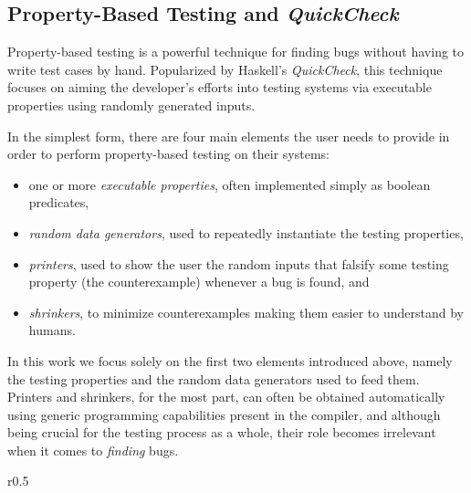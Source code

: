 \documentclass[acmsmall, anonymous]{acmart}
\newcommand{\quickcheck}{\textit{QuickCheck}\xspace}
\newcommand{\quickchick}{\textit{QuickChick}\xspace}
\newcommand{\mutagen}{\textsc{Mutagen}\xspace}
\begin{document}

\vspace{-5pt}
\subsection{Property-Based Testing and \quickcheck}

Property-based testing is a powerful technique for finding bugs without having
to write test cases by hand.
%
Popularized by Haskell's \quickcheck, this technique focuses on aiming the
developer's efforts into testing systems via executable properties using
randomly generated inputs.
%


In the simplest form, there are four main elements the user needs to provide in
order to perform property-based testing on their systems:
%
\begin{itemize}
\item one or more \emph{executable properties}, often implemented simply as
  boolean predicates,
\item \emph{random data generators}, used to repeatedly instantiate the testing
  properties,
\item \emph{printers}, used to show the user the random inputs that falsify some
  testing property (the counterexample) whenever a bug is found, and
\item \emph{shrinkers}, to minimize counterexamples making them easier to
  understand by humans.
\end{itemize}

\noindent In this work we focus solely on the first two elements introduced
above, namely the testing properties and the random data generators used to feed
them.
%
Printers and shrinkers, for the most part, can often be obtained automatically
using generic programming capabilities present in the compiler, and although
being crucial for the testing process as a whole, their role becomes irrelevant
when it comes to \emph{finding} bugs.

\begin{wrapfigure}{r}{0.5\textwidth}
\vspace{-10pt}
\begin{algorithm}[H]
  \SetInd{0em}{0.75em}
  \SetAlgoLined
  \DontPrintSemicolon
\caption{\label{algo:quickcheck}\quickcheck Testing Loop}
\end{algorithm}
\vspace{-10pt}
\end{wrapfigure}
\end{document}
